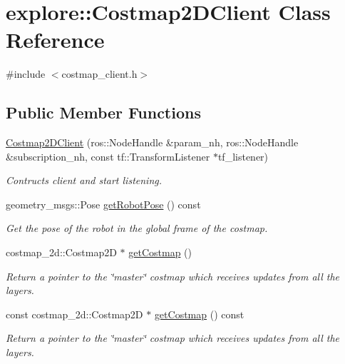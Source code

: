 \hypertarget{classexplore_1_1Costmap2DClient}{}\section{explore\+:\+:Costmap2\+D\+Client Class Reference}
\label{classexplore_1_1Costmap2DClient}


{\ttfamily \#include $<$costmap\+\_\+client.\+h$>$}

\subsection*{Public Member Functions}
\begin{DoxyCompactItemize}
\item 
\hyperlink{classexplore_1_1Costmap2DClient_a0c7fe155a1ac35503a7906e0f23bde3a}{Costmap2\+D\+Client} (ros\+::\+Node\+Handle \&param\+\_\+nh, ros\+::\+Node\+Handle \&subscription\+\_\+nh, const tf\+::\+Transform\+Listener $\ast$tf\+\_\+listener)
\begin{DoxyCompactList}\small\item\em Contructs client and start listening. \end{DoxyCompactList}\item 
geometry\+\_\+msgs\+::\+Pose \hyperlink{classexplore_1_1Costmap2DClient_ae7c4fa4e8e83916f0f8e0ad126c4bbae}{get\+Robot\+Pose} () const 
\begin{DoxyCompactList}\small\item\em Get the pose of the robot in the global frame of the costmap. \end{DoxyCompactList}\item 
costmap\+\_\+2d\+::\+Costmap2D $\ast$ \hyperlink{classexplore_1_1Costmap2DClient_a6c2cb3946a589eb2708092b762a0ca19}{get\+Costmap} ()
\begin{DoxyCompactList}\small\item\em Return a pointer to the \char`\"{}master\char`\"{} costmap which receives updates from all the layers. \end{DoxyCompactList}\item 
const costmap\+\_\+2d\+::\+Costmap2D $\ast$ \hyperlink{classexplore_1_1Costmap2DClient_ac6e206858506129629085e583730b750}{get\+Costmap} () const 
\begin{DoxyCompactList}\small\item\em Return a pointer to the \char`\"{}master\char`\"{} costmap which receives updates from all the layers. \end{DoxyCompactList}\item 

\end{DoxyCompactItemize}
